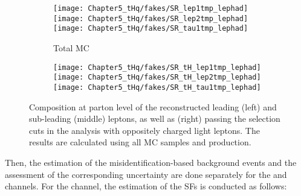 \begin{figure}[h]
  \begin{subfigure}[b]{0.99\linewidth}
       \centering
       \texttt{[image: Chapter5\_tHq/fakes/SR\_lep1tmp\_lephad]}
       \texttt{[image: Chapter5\_tHq/fakes/SR\_lep2tmp\_lephad]}
       \texttt{[image: Chapter5\_tHq/fakes/SR\_tau1tmp\_lephad]}
       \caption{Total MC}
  \end{subfigure}
  \begin{subfigure}[b]{0.99\linewidth}
      \centering
      \texttt{[image: Chapter5\_tHq/fakes/SR\_tH\_lep1tmp\_lephad]}
      \texttt{[image: Chapter5\_tHq/fakes/SR\_tH\_lep2tmp\_lephad]}
      \texttt{[image: Chapter5\_tHq/fakes/SR\_tH\_tau1tmp\_lephad]}
      \caption{\tHq}
  \end{subfigure}
   \caption{Composition at parton level of the reconstructed leading (left) and sub-leading (middle) leptons, as well as \tauhad (right) passing the selection cuts in the \dileptau analysis with oppositely charged light leptons. The results are calculated using all MC samples and \tHq production.}
   \label{fig:piecharts_dileptau_total_vs_tHq}
\end{figure}




Then, the estimation of the misidentification-based background events and the assessment of the corresponding 
uncertainty are done separately for the \dilepOStau and \dilepSStau channels. For the \dilepOStau channel, the
estimation of the SFs is conducted as follows:

